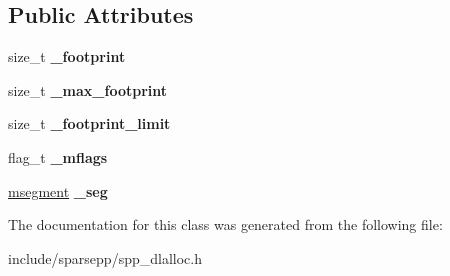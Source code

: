 \subsection*{Public Attributes}
\begin{DoxyCompactItemize}
\item 
size\+\_\+t {\bfseries \+\_\+footprint}\hypertarget{classspp_1_1malloc__state_aac068f3b09d8bac0d7f22e25ab1ad7f5}{}\label{classspp_1_1malloc__state_aac068f3b09d8bac0d7f22e25ab1ad7f5}

\item 
size\+\_\+t {\bfseries \+\_\+max\+\_\+footprint}\hypertarget{classspp_1_1malloc__state_a68cb4370d88f2641ae2a9da584766b69}{}\label{classspp_1_1malloc__state_a68cb4370d88f2641ae2a9da584766b69}

\item 
size\+\_\+t {\bfseries \+\_\+footprint\+\_\+limit}\hypertarget{classspp_1_1malloc__state_a3cc44f377d222a88fc0984a97b6a27aa}{}\label{classspp_1_1malloc__state_a3cc44f377d222a88fc0984a97b6a27aa}

\item 
flag\+\_\+t {\bfseries \+\_\+mflags}\hypertarget{classspp_1_1malloc__state_a1e6e169f9360b06807a45c1f187cb244}{}\label{classspp_1_1malloc__state_a1e6e169f9360b06807a45c1f187cb244}

\item 
\hyperlink{structspp_1_1malloc__segment}{msegment} {\bfseries \+\_\+seg}\hypertarget{classspp_1_1malloc__state_aabcc376a84274264495a830b111a795a}{}\label{classspp_1_1malloc__state_aabcc376a84274264495a830b111a795a}

\end{DoxyCompactItemize}


The documentation for this class was generated from the following file\+:\begin{DoxyCompactItemize}
\item 
include/sparsepp/spp\+\_\+dlalloc.\+h\end{DoxyCompactItemize}
